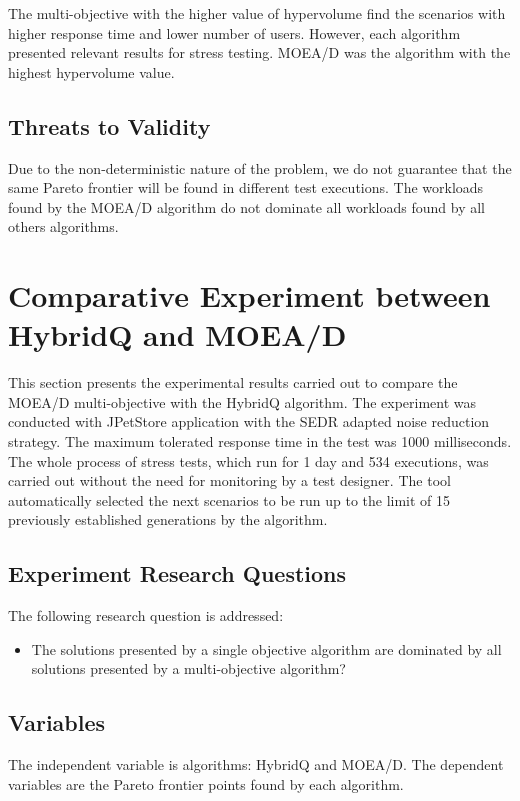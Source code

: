 \documentclass[espaco=umemeio,chapter=TITLE,twoside,openright]{abnt}
\begin{document}
The multi-objective with the higher value of hypervolume find the scenarios with higher response time and lower number of users. However, each algorithm presented relevant results for stress testing. MOEA/D was the algorithm with the highest hypervolume value.

\subsection{Threats to Validity}

Due to the non-deterministic nature of the problem, we do not guarantee that the same Pareto frontier will be found in different test executions. The workloads found by the MOEA/D algorithm  do not dominate all workloads found by all others algorithms.


\section{Comparative Experiment between HybridQ and MOEA/D}

This section presents the experimental results carried out to  compare the MOEA/D multi-objective with the HybridQ algorithm. The experiment was conducted with JPetStore application with the SEDR adapted  noise reduction strategy. The maximum tolerated response time in the test was 1000 milliseconds.  The whole process of stress  tests, which run for 1 day and 534 executions, was carried out without the need for monitoring by a test designer. The tool automatically selected the next scenarios to be run up to the limit of 15 previously established  generations by the algorithm. 

\subsection{Experiment Research Questions}

The following research question is addressed:
\begin{itemize}
\item The solutions presented by a single objective algorithm are dominated by all solutions presented by a multi-objective algorithm?
\end{itemize}

\subsection{Variables}

The independent variable is algorithms: HybridQ and MOEA/D. The dependent variables are the Pareto frontier points found by each algorithm.
\end{document}
